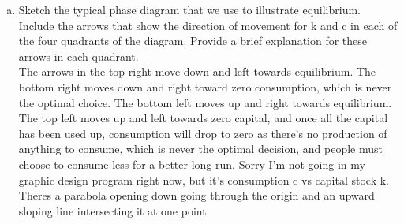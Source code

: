 \documentclass[11pt]{article}
\begin{document}
\begin{itemize}
\begin{enumerate}[(a)]
\item Sketch the typical phase diagram that we use to illustrate equilibrium. Include
the arrows that show the direction of movement for k and c in each of the four
quadrants of the diagram. Provide a brief explanation for these arrows in each
quadrant.
\\The arrows in the top right move down and left towards equilibrium. The bottom right moves down and right toward zero consumption, which is never the optimal choice. The bottom left moves up and right towards equilibrium. The top left moves up and left towards zero capital, and once all the capital has been used up, consumption will drop to zero as there's no production of anything to consume, which is never the optimal decision, and people must choose to consume less for a better long run. Sorry I'm not going in my graphic design program right now, but it's consumption c vs capital stock k. Theres a parabola opening down going through the origin and an upward sloping line intersecting it at one point.
\end{enumerate}


\newpage

\vspace{0.1in}


\end{itemize}
\end{document}
